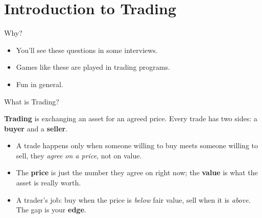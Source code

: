 %


\section{Introduction to Trading}

\begin{frame}{Why?}
  \begin{itemize}
    \item You'll see these questions in some interviews.
    \item Games like these are played in trading programs.
    \item Fun in general.
  \end{itemize}
\end{frame}

\begin{frame}{What is Trading?}
  \begin{sqt:definition}
    \textbf{Trading} is exchanging an asset for an agreed price. Every trade
    has two sides: a \textbf{buyer} and a \textbf{seller}.
  \end{sqt:definition}

  \begin{itemize}
    \item A trade happens only when someone willing to buy meets someone
      willing to sell, they \emph{agree on a price}, not on value.
    \item The \textbf{price} is just the number they agree on right now; the
      \textbf{value} is what the asset is really worth.
    \item A trader's job: buy when the price is \emph{below} fair value, sell
      when it is \emph{above}. The gap is your \textbf{edge}.
  \end{itemize}

\end{frame}

